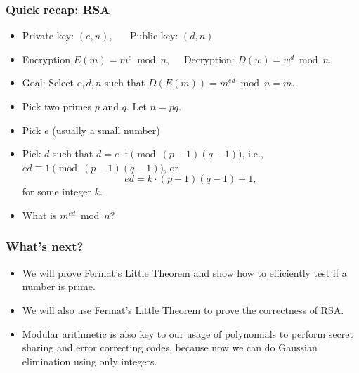 \begin{frame}
  \frametitle{Quick recap: RSA}

  {\small
  \begin{itemize}
  \item Private key: $(e,n)$, \ \ \  Public key: $(d,n)$
  \item Encryption $E(m) = m^{e} \bmod n$,\ \ \  Decryption: $D(w) = w^{d} \bmod n$.
  \item Goal: Select $e,d,n$ such that $D(E(m)) = m^{ed}\bmod n = m$.
  \end{itemize}
  }
  
  \vspace{0.1in}
  \pause
  {\footnotesize
  \begin{itemize}
  \item Pick two primes $p$ and $q$.  Let $n=pq$.
  \item Pick $e$ (usually a small number)
  \item Pick $d$ such that $d = e^{-1} \pmod{(p-1)(q-1)}$, i.e., $ed\equiv 1 \pmod{(p-1)(q-1)}$, or
    \[
    ed = k\cdot(p-1)(q-1) + 1, 
    \]
    for some integer $k$.
  \item What is $m^{ed}\bmod n$?
  \end{itemize}
  }
  \vspace{0.5in}
\end{frame}

\begin{frame}
  \frametitle{What's next?}

  \begin{itemize}
  \item We will prove Fermat's Little Theorem and show how to
    efficiently test if a number is prime.
  \item We will also use Fermat's Little Theorem to prove the
    correctness of RSA.
  \item Modular arithmetic is also key to our usage of polynomials to
    perform secret sharing and error correcting codes, because now we
    can do Gaussian elimination using only integers.
  \end{itemize}
\end{frame}
